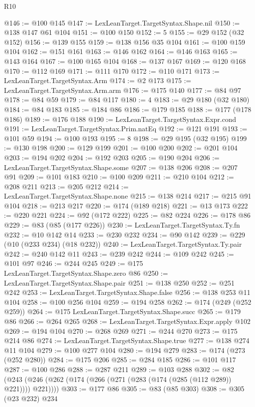 \begin{lexlean}{R10}
\begin{coremodule}
@146 := @100 @145
@147 := LexLeanTarget.TargetSyntax.Shape.nil
@150 := @138 @147 @61 @104
@151 := @100 @150
@152 := 5
@155 := @29 @152 (@32 @152)
@156 := @139 @155
@159 := @138 @156 @35 @104
@161 := @100 @159 @104
@162 := @151 @161
@163 := @146 @162
@164 := @146 @163
@165 := @143 @164
@167 := @100 @165 @104
@168 := @137 @167
@169 := @120 @168
@170 := @112 @169
@171 := @111 @170
@172 := @110 @171
@173 := LexLeanTarget.TargetSyntax.Arm
@174 := @2 @173
@175 := LexLeanTarget.TargetSyntax.Arm.arm
@176 := @175 @140
@177 := @84 @97
@178 := @84 @59
@179 := @84 @117
@180 := 4
@183 := @29 @180 (@32 @180)
@184 := @84 @183
@185 := @184 @86
@186 := @179 @185
@188 := @177 (@178 @186)
@189 := @176 @188
@190 := LexLeanTarget.TargetSyntax.Expr.cond
@191 := LexLeanTarget.TargetSyntax.Prim.natEq
@192 := @121 @191
@193 := @101 @59
@194 := @100 @193
@195 := 8
@198 := @29 @195 (@32 @195)
@199 := @130 @198
@200 := @129 @199
@201 := @100 @200
@202 := @201 @104
@203 := @194 @202
@204 := @192 @203
@205 := @190 @204
@206 := LexLeanTarget.TargetSyntax.Shape.some
@207 := @138 @206
@208 := @207 @91
@209 := @101 @183
@210 := @100 @209
@211 := @210 @104
@212 := @208 @211
@213 := @205 @212
@214 := LexLeanTarget.TargetSyntax.Shape.none
@215 := @138 @214
@217 := @215 @91 @104
@218 := @213 @217
@220 := @174 (@189 @218)
@221 := @13 @173
@222 := @220 @221
@224 := @92 (@172 @222)
@225 := @82 @224
@226 := @178 @86
@229 := @83 (@85 (@177 @226))
@230 := LexLeanTarget.TargetSyntax.Ty.fn
@232 := @10 @142 @14
@233 := @230 @232
@234 := @90 @142
@239 := @229 (@10 (@233 @234) (@18 @232))
@240 := LexLeanTarget.TargetSyntax.Ty.pair
@242 := @240 @142 @11
@243 := @239 @242
@244 := @109 @242
@245 := @101 @97
@246 := @244 @245
@249 := @175 LexLeanTarget.TargetSyntax.Shape.zero @86
@250 := LexLeanTarget.TargetSyntax.Shape.pair
@251 := @138 @250
@252 := @251 @242
@253 := LexLeanTarget.TargetSyntax.Shape.false
@256 := @138 @253 @11 @104
@258 := @100 @256 @104
@259 := @194 @258
@262 := @174 (@249 (@252 @259))
@264 := @175 LexLeanTarget.TargetSyntax.Shape.succ
@265 := @179 @86
@266 := @264 @265
@268 := LexLeanTarget.TargetSyntax.Expr.apply @102
@269 := @194 @104
@270 := @268 @269
@271 := @244 @270
@273 := @175 @214 @86
@274 := LexLeanTarget.TargetSyntax.Shape.true
@277 := @138 @274 @11 @104
@279 := @100 @277 @104
@280 := @194 @279
@283 := @174 (@273 (@252 @280))
@284 := @175 @206
@285 := @284 @185
@286 := @101 @117
@287 := @100 @286
@288 := @287 @211
@289 := @103 @288
@302 := @82 (@243 (@246 (@262 (@174 (@266 (@271 (@283 (@174 (@285 (@112 @289)) @221)))) @221))))
@303 := @177 @86
@305 := @83 (@85 @303)
@308 := @305 (@23 @232) @234

\end{coremodule}
\end{lexlean}
